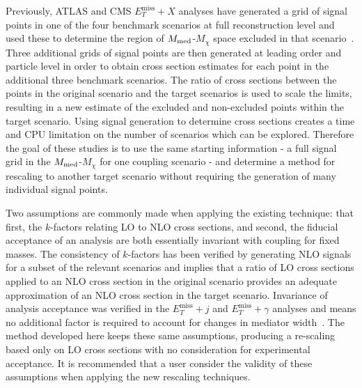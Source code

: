\documentclass[a4paper, 11pt,notoc]{article}
\newcommand{\MET}{\ensuremath{E_T^\mathrm{miss}}\xspace}
\newcommand{\met}{\MET}
\newcommand{\mDM}{\ensuremath{M_{\chi}}\xspace}
\newcommand{\mMed}{\ensuremath{M_{\rm{med}}}\xspace}
\newcommand{\metplusx}{\ensuremath{\MET+X}\xspace}
\begin{document}
Previously, ATLAS and CMS \metplusx analyses have generated a grid of signal points in one of the four benchmark scenarios at full reconstruction level and used these to determine the region of \mMed-\mDM space excluded in that scenario~\cite{atlas_monojet_36ifb, cms_monojet_12ifb}. Three additional grids of signal points are then generated at leading order and particle level in order to obtain cross section estimates for each point in the additional three benchmark scenarios. The ratio of cross sections between the points in the original scenario and the target scenarios is used to scale the limits, resulting in a new estimate of the excluded and non-excluded points within the target scenario. 
Using signal generation to determine cross sections creates a time and CPU limitation on the number of scenarios which can be explored. 
Therefore the goal of these studies is to use the same starting information - a full signal grid in the \mMed-\mDM for one coupling scenario - and determine a method for rescaling to another target scenario without requiring the generation of many individual signal points. 

Two assumptions are commonly made when applying the existing technique: that first, the $k$-factors relating LO to NLO cross sections, and second, the fiducial acceptance of an analysis are both essentially invariant with coupling for fixed masses. The consistency of $k$-factors has been verified by generating NLO signals for a subset of the relevant scenarios and implies that a ratio of LO cross sections applied to an NLO cross section in the original scenario provides an adequate approximation of an NLO cross section in the target scenario. Invariance of analysis acceptance was verified in the $\met+j$ and $\met+\gamma$ analyses and means no additional factor is required to account for changes in mediator width~\cite{DMSP}.
The method developed here keeps these same assumptions, producing a re-scaling based only on LO cross sections with no consideration for experimental acceptance. It is recommended that a user consider the validity of these assumptions when applying the new rescaling techniques. 
\end{document}
